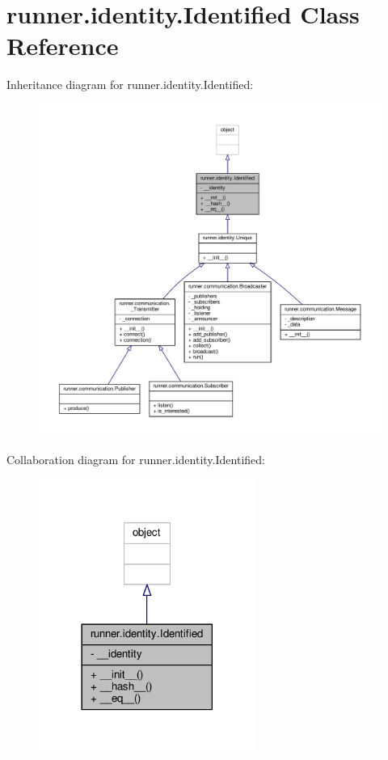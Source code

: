 \hypertarget{classrunner_1_1identity_1_1Identified}{}\section{runner.\+identity.\+Identified Class Reference}
\label{classrunner_1_1identity_1_1Identified}


Inheritance diagram for runner.\+identity.\+Identified\+:
\nopagebreak
\begin{figure}[H]
\begin{center}
\leavevmode
\includegraphics[width=350pt]{classrunner_1_1identity_1_1Identified__inherit__graph}
\end{center}
\end{figure}


Collaboration diagram for runner.\+identity.\+Identified\+:
\nopagebreak
\begin{figure}[H]
\begin{center}
\leavevmode
\includegraphics[width=201pt]{classrunner_1_1identity_1_1Identified__coll__graph}
\end{center}
\end{figure}
